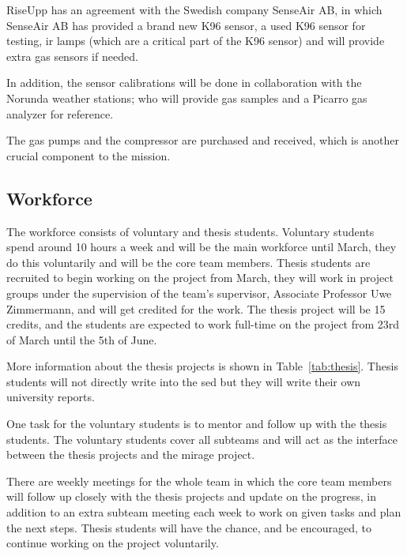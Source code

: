 \documentclass[
  a4paper,
  11pt,
  openany,
  parskip,
  toc=totoc,
  listof=totoc,
  bibliography=totoc
]{scrreprt}
\newcommand{\tref}[1]{Table~\ref{#1}}
\begin{document}
RiseUpp has an agreement with the Swedish company SenseAir AB, in which SenseAir AB has provided a brand new K96 sensor, a used K96 sensor for testing, \gls{ir} lamps (which are a critical part of the K96 sensor) and will provide extra gas sensors if needed.

In addition, the sensor calibrations will be done in collaboration with the Norunda weather stations; who will provide gas samples and a Picarro gas analyzer for reference.

The gas pumps and the compressor are purchased and received, which is another crucial component to the mission.

\subsection{Workforce}

The workforce consists of voluntary and thesis students. Voluntary students spend around 10 hours a week and will be the main workforce until March, they do this voluntarily and will be the core team members. Thesis students are recruited to begin working on the project from March, they will work in project groups under the supervision of the team's supervisor, Associate Professor Uwe Zimmermann, and will get credited for the work. The thesis project will be 15 credits, and the students are expected to work full-time on the project from 23rd of March until the 5th of June.

More information about the thesis projects is shown in \tref{tab:thesis}. Thesis students will not directly write into the \gls{sed} but they will write their own university reports.

One task for the voluntary students is to mentor and follow up with the thesis students. The voluntary students cover all subteams and will act as the interface between the thesis projects and the \gls{mirage} project.

There are weekly meetings for the whole team in which the core team members will follow up closely with the thesis projects and update on the progress, in addition to an extra subteam meeting each week to work on given tasks and plan the next steps. Thesis students will have the chance, and be encouraged, to continue working on the project voluntarily.
\end{document}
